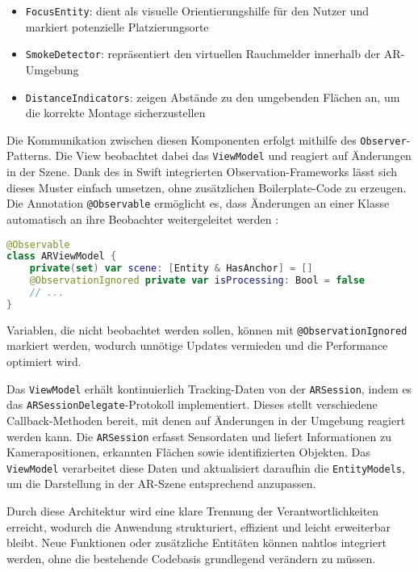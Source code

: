 \begin{itemize}
    \item \texttt{FocusEntity}: dient als visuelle Orientierungshilfe für den Nutzer und markiert potenzielle Platzierungsorte
    \item \texttt{SmokeDetector}: repräsentiert den virtuellen Rauchmelder innerhalb der AR-Umgebung
    \item \texttt{DistanceIndicators}: zeigen Abstände zu den umgebenden Flächen an, um die korrekte Montage sicherzustellen
\end{itemize}

Die Kommunikation zwischen diesen Komponenten erfolgt mithilfe des \texttt{Observer}-Patterns. Die View beobachtet dabei das \texttt{ViewModel} und reagiert auf Änderungen in der Szene. Dank des in Swift integrierten Observation-Frameworks lässt sich dieses Muster einfach umsetzen, ohne zusätzlichen Boilerplate-Code zu erzeugen. Die Annotation \texttt{@Observable} ermöglicht es, dass Änderungen an einer Klasse automatisch an ihre Beobachter weitergeleitet werden \cite{appledevdoc}:

\begin{lstlisting}[language=Swift]
@Observable
class ARViewModel {
    private(set) var scene: [Entity & HasAnchor] = []
    @ObservationIgnored private var isProcessing: Bool = false
    // ...
}
\end{lstlisting}

Variablen, die nicht beobachtet werden sollen, können mit \texttt{@ObservationIgnored} markiert werden, wodurch unnötige Updates vermieden und die Performance optimiert wird. \cite{appledevdoc}

Das \texttt{ViewModel} erhält kontinuierlich Tracking-Daten von der \texttt{ARSession}, indem es das \linebreak\texttt{ARSessionDelegate}-Protokoll implementiert. Dieses stellt verschiedene Callback-Methoden bereit, mit denen auf Änderungen in der Umgebung reagiert werden kann. Die \texttt{ARSession} erfasst Sensordaten und liefert Informationen zu Kamerapositionen, erkannten Flächen sowie identifizierten Objekten. Das \texttt{ViewModel} verarbeitet diese Daten und aktualisiert daraufhin die \texttt{EntityModels}, um die Darstellung in der AR-Szene entsprechend anzupassen.

Durch diese Architektur wird eine klare Trennung der Verantwortlichkeiten erreicht, wodurch die Anwendung strukturiert, effizient und leicht erweiterbar bleibt. Neue Funktionen oder zusätzliche Entitäten können nahtlos integriert werden, ohne die bestehende Codebasis grundlegend verändern zu müssen.

